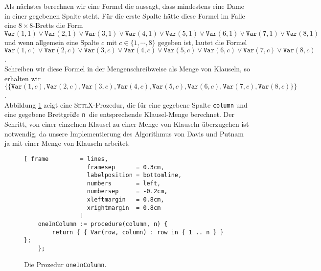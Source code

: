 Als n\"{a}chstes berechnen wir eine Formel die aussagt, dass mindestens eine Dame in einer gegebenen
Spalte steht.  F\"{u}r die erste Spalte h\"{a}tte diese Formel im Falle eine $8 \times 8$-Bretts die Form 
\\[0.2cm]
\hspace*{1.3cm}
$\texttt{Var}(1,1) \vee \texttt{Var}(2,1) \vee \texttt{Var}(3,1) \vee \texttt{Var}(4,1) \vee \texttt{Var}(5,1) \vee
\texttt{Var}(6,1) \vee \texttt{Var}(7,1) \vee \texttt{Var}(8,1)$
\\[0.2cm]
und wenn allgemein eine Spalte $c$ mit $c \in \{1,\cdots,8\}$ gegeben ist, lautet die Formel
\\[0.2cm]
\hspace*{1.3cm}
$\texttt{Var}(1,c) \vee \texttt{Var}(2,c) \vee \texttt{Var}(3,c) \vee \texttt{Var}(4,c) \vee \texttt{Var}(5,c) \vee
\texttt{Var}(6,c) \vee \texttt{Var}(7,c) \vee \texttt{Var}(8,c)$.
\\[0.2cm]
Schreiben wir diese Formel in der Mengenschreibweise als Menge von Klauseln, so erhalten wir
\\[0.2cm]
\hspace*{1.3cm}
$\bigl\{ \{\texttt{Var}(1,c) , \texttt{Var}(2,c) , \texttt{Var}(3,c) , \texttt{Var}(4,c) , \texttt{Var}(5,c) ,
\texttt{Var}(6,c) , \texttt{Var}(7,c) , \texttt{Var}(8,c) \}\bigr\}$.
\\[0.2cm]
Abbildung \ref{fig:oneInColumn} zeigt eine \textsc{SetlX}-Prozedur, die f\"{u}r eine gegebene Spalte
\texttt{column} und eine gegebene Brettgr\"{o}\ss{}e \texttt{n }die entsprechende Klausel-Menge berechnet.
Der Schritt, von einer einzelnen Klausel 
zu einer Menge von Klauseln \"{u}berzugehen ist notwendig, da unsere Implementierung des Algorithmus von
Davis und Putnam ja mit einer Menge von Klauseln arbeitet.

\begin{figure}[!ht]
  \centering
\begin{Verbatim}[ frame         = lines, 
                  framesep      = 0.3cm, 
                  labelposition = bottomline,
                  numbers       = left,
                  numbersep     = -0.2cm,
                  xleftmargin   = 0.8cm,
                  xrightmargin  = 0.8cm
                ]
    oneInColumn := procedure(column, n) {
        return { { Var(row, column) : row in { 1 .. n } } };
    };
\end{Verbatim}
\vspace*{-0.3cm}
  \caption{Die Prozedur \texttt{oneInColumn}.}
  \label{fig:oneInColumn}
\end{figure}

